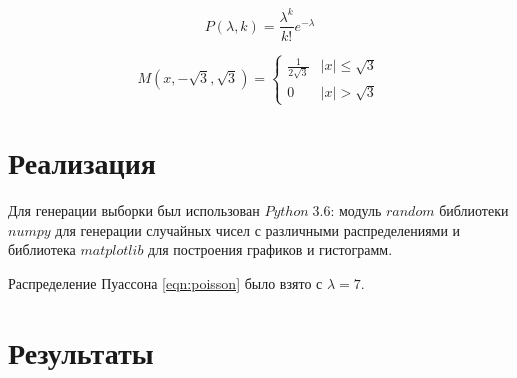 \documentclass[a4]{article}
\begin{document}
 \begin{equation}\label{eqn:poisson}
 P(\lambda,k) = \frac{\lambda^k}{k!}e^{-\lambda}
\end{equation}  

\begin{equation}\label{eqn:uniform}
M(x,-\sqrt{3}, \sqrt{3}) = 
 \begin{cases}
   \frac{1}{2\sqrt{3}} &\vert x\vert \leqslant \sqrt{3}\\
   0 &\vert x\vert > \sqrt{3}
 \end{cases}
\end{equation}


\section{Реализация}
Для генерации выборки был использован $Python\;3.6$: модуль $random$ библиотеки $numpy$ для генерации случайных чисел с различными распределениями и библиотека $matplotlib$ для построения графиков и гистограмм.

Распределение Пуассона \eqref{eqn:poisson} было взято с $\lambda = 7.$
\section{Результаты}
\end{document}
